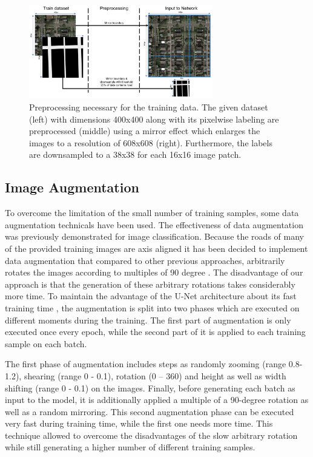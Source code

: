 \documentclass[10pt,conference,compsocconf]{IEEEtran}
\begin{document}
\begin{figure}
\includegraphics[width={8cm}]{preprocessing}
\caption{Preprocessing necessary for the training data. The given dataset (left) with dimensions 400x400 along with its pixelwise labeling are preprocessed (middle) using a mirror effect which enlarges the images to a resolution of 608x608 (right). Furthermore, the labels are downsampled to a 38x38 for each 16x16 image patch.}
\label{fig:preprocessing}
\end{figure}

\subsection{Image Augmentation}

To overcome the limitation of the small number of training samples, some data augmentation technicals have been used. The effectiveness of data augmentation was previously demonstrated \cite{Wang} for image classification. Because the roads of many of the provided training images are axis aligned it has been decided to implement data augmentation that compared to other previous approaches, arbitrarily rotates the images according to multiples of 90 degree \cite{Pavllo2017}. The disadvantage of our approach is that the generation of these arbitrary rotations takes considerably more time. To maintain the advantage of the U-Net architecture about its fast training time \cite{Ronneberger2015}, the augmentation is split into two phases which are executed on different moments during the training. The first part of augmentation is only executed once every epoch, while the second part of it is applied to each training sample on each batch.

The first phase of augmentation includes steps as randomly zooming (range 0.8-1.2), shearing (range 0 - 0.1), rotation (0 – 360) and height as well as width shifting (range 0 - 0.1) on the images. Finally, before generating each batch as input to the model, it is additionally applied a multiple of a 90-degree rotation as well as a random mirroring. This second augmentation phase can be executed very fast during training time, while the first one needs more time. This technique allowed to overcome the disadvantages of the slow arbitrary rotation while still generating a higher number of different training samples.
\end{document}
